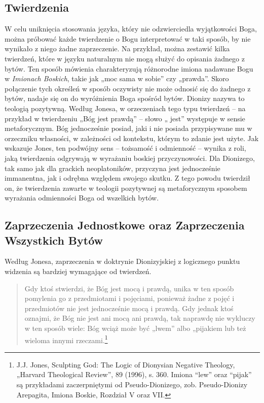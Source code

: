 \subsection{Twierdzenia}

W celu uniknięcia stosowania języka, który nie odzwierciedla
wyjątkowości Boga, można próbować każde twierdzenie o Bogu
interpretować w taki sposób, by nie wynikało z niego żadne
zaprzeczenie. Na przykład, można zestawić kilka twierdzeń, które w
języku naturalnym nie mogą służyć do opisania żadnego z bytów. Ten
sposób mówienia charakteryzują różnorodne imiona nadawane Bogu w
\textit{Imionach Boskich}, takie jak „moc sama w sobie” czy „prawda”.
Skoro połączenie tych określeń w sposób oczywisty nie może odnosić się
do żadnego z bytów, nadaje się on do wyróżnienia Boga spośród bytów.
Dionizy nazywa to teologią pozytywną. Według Jonesa, w orzeczeniach
tego typu twierdzeń -- na przykład w twierdzeniu „Bóg jest prawdą” –
słowo „ jest” występuje w sensie metaforycznym. Bóg jednocześnie
posiad, jaki i nie posiada przypisywane mu w orzeczniku własności, w
zależności od kontekstu, którym to zdanie jest użyte. Jak wskazuje
Jones, ten podwójny sens -- tożsamość i odmienność -- wynika z roli, jaką
twierdzenia odgrywają w wyrażaniu boskiej przyczynowości. Dla
Dionizego, tak samo jak dla grackich neoplatoników, przyczyna jest
jednocześnie immanentna, jak i odrębna względem swojego skutku. Z tego
powodu twierdził on, że twierdzenia zawarte w teologii pozytywnej są
metaforycznym sposobem wyrażania odmienności Boga od wszelkich bytów.


\subsection{Zaprzeczenia Jednostkowe oraz Zaprzeczenia Wszystkich Bytów}

Według Jonesa, zaprzeczenia w doktrynie Dionizyjskiej z logicznego
punktu widzenia są bardziej wymagające od twierdzeń.


\begin{quote}
    Gdy ktoś stwierdzi, że Bóg jest mocą i prawdą, unika w ten sposób
pomylenia go z przedmiotami i pojęciami, ponieważ żadne z pojęć i
przedmiotów nie jest jednocześnie mocą i prawdą. Gdy jednak ktoś
oznajmi, że Bóg nie jest ani mocą ani prawdą, tak naprawdę nie wykluczy
w ten sposób wiele: Bóg wciąż może być „lwem” albo „pijakiem lub też
wieloma innymi rzeczami.\footnote{J.J. Jones, Sculpting God: The Logic
of Dionysian Negative Theology, „Harvard Theological Review”, 89
(1996), s. 360. Imiona “lew” oraz “pijak” są przykładami zaczerpniętymi
od Pseudo-Dionizego, zob. Pseudo-Dionizy Arepagita, Imiona Boskie,
Rozdział V oraz VII.}
\end{quote}



